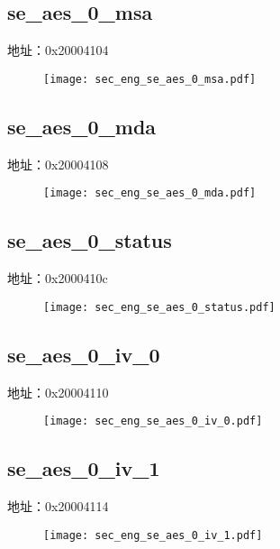 \subsection{se\_aes\_0\_msa}
\label{sec_eng-se-aes-0-msa}
地址：0x20004104
 \begin{figure}[H]
\texttt{[image: sec\_eng\_se\_aes\_0\_msa.pdf]}
\end{figure}

\subsection{se\_aes\_0\_mda}
\label{sec_eng-se-aes-0-mda}
地址：0x20004108
 \begin{figure}[H]
\texttt{[image: sec\_eng\_se\_aes\_0\_mda.pdf]}
\end{figure}

\subsection{se\_aes\_0\_status}
\label{sec_eng-se-aes-0-status}
地址：0x2000410c
 \begin{figure}[H]
\texttt{[image: sec\_eng\_se\_aes\_0\_status.pdf]}
\end{figure}

\subsection{se\_aes\_0\_iv\_0}
\label{sec_eng-se-aes-0-iv-0}
地址：0x20004110
 \begin{figure}[H]
\texttt{[image: sec\_eng\_se\_aes\_0\_iv\_0.pdf]}
\end{figure}

\subsection{se\_aes\_0\_iv\_1}
\label{sec_eng-se-aes-0-iv-1}
地址：0x20004114
 \begin{figure}[H]
\texttt{[image: sec\_eng\_se\_aes\_0\_iv\_1.pdf]}
\end{figure}

